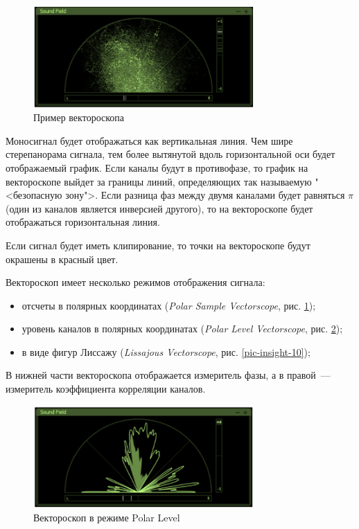 \documentclass[oneside, final, 14pt]{extreport}
\begin{document}
\begin{figure}[h!]
\centering
\includegraphics[width=0.75\textwidth]{pic-insight-09}
\caption{Пример вектороскопа}
\label{pic-insight-08}
\end{figure}

Моносигнал будет отображаться как вертикальная линия. Чем шире стерепанорама сигнала, тем более вытянутой вдоль горизонтальной оси будет отображаемый график. Если каналы будут в противофазе, то график на вектороскопе выйдет за границы линий, определяющих так называемую "<безопасную зону">. Если разница фаз между двумя каналами будет равняться $\pi$ (один из каналов является инверсией другого), то на вектороскопе будет отображаться горизонтальная линия.

Если сигнал будет иметь клипирование, то точки на вектороскопе будут окрашены в красный цвет.

Вектороскоп имеет несколько режимов отображения сигнала:
\begin{itemize}
\item отсчеты в полярных координатах (\textit{Polar Sample Vectorscope}, рис. \ref{pic-insight-08});
\item уровень каналов в полярных координатах (\textit{Polar Level Vectorscope}, рис. \ref{pic-insight-09});
\item в виде фигур Лиссажу (\textit{Lissajous Vectorscope}, рис. \ref{pic-insight-10});
\end{itemize}

В нижней части вектороскопа отображается измеритель фазы, а в правой~--- измеритель коэффициента корреляции каналов.

\begin{figure}[h!]
\centering
\includegraphics[width=0.75\textwidth]{pic-insight-10}
\caption{Вектороскоп в режиме Polar Level}
\label{pic-insight-09}
\end{figure}
\end{document}
